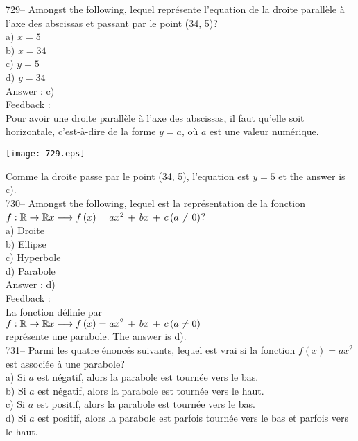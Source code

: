 \documentclass[letterpaper, 12pt]{article}
\begin{document}
729-- Amongst the following, lequel repr\'esente l'equation de
la droite parall\`ele \`a l'axe des abscissas et passant par le point (34,
5)?\\
a) $x=5$\\
b) $x=34$\\
c) $y=5$\\
d) $y=34$\\

Answer : c)\\

Feedback : \\
Pour avoir une droite parall\`ele \`a l'axe des abscissas, il faut
qu'elle soit horizontale, c'est-\`a-dire de la forme $y=a$, o\`u $a$
est une valeur num\'erique.   \begin{center}
    \texttt{[image: 729.eps]}
    \end{center}
     Comme la droite passe par le point (34, 5), l'equation est
$y=5$ et the answer is c).\\


730-- Amongst the following, lequel est la repr\'esentation de la
fonction \\
$f :\mathbb{R}\rightarrow\mathbb{R}\\
x\longmapsto f\left( x\right) =ax^{2}\,+\,bx\,+\,c \left( a\neq 0
\right)$?\\
a) Droite\\
b) Ellipse \\
c) Hyperbole\\
d) Parabole \\

Answer : d)\\

Feedback : \\
La fonction d\'efinie par\\
$f :\mathbb{R}\rightarrow\mathbb{R}\\
x\longmapsto f\left( x\right) =ax^{2}\,+\,bx\,+\,c \left( a\neq 0 \right)$
\\
repr\'esente une parabole.  The answer is d).\\

731-- Parmi les quatre \'enonc\'es suivants, lequel est vrai si la fonction
$f(x)=ax^{2}$ est associ\'ee \`a une parabole?\\
a) Si $a$ est n\'egatif, alors la parabole est tourn\'ee vers le bas.\\
b) Si $a$ est n\'egatif, alors la parabole est tourn\'ee vers le haut.  \\
c) Si $a$ est positif, alors la parabole est tourn\'ee vers le bas.\\
d) Si $a$ est positif, alors la parabole est parfois tourn\'ee vers le bas
et parfois vers le haut.\\
\end{document}
